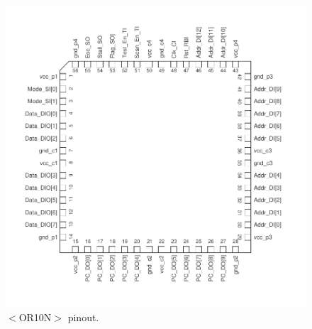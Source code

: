 \begin{figure}[!htbp]

  \centering \includegraphics[width=1.0\textwidth]{./figures/asic_pinout}
  \caption{$<$OR10N$>$ pinout.}
  \label{fig:pinout2}
\end{figure}
